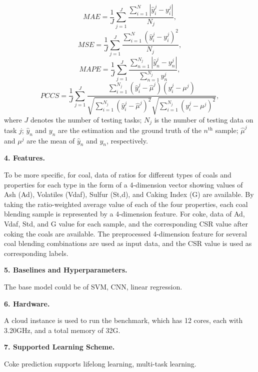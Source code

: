 \begin{equation} \label{equ:mae} 
MAE = \frac{1}{J} \sum^J_{j=1} \frac{\sum_{i=1}^N |\hat{y}^{j}_{i} - y^{j}_{i}|}{N_j}, 
\end{equation}
\begin{equation} \label{equ:mse} 
MSE = \frac{1}{J} \sum^J_{j=1} \frac{\sum_{i=1}^N (\hat{y}^{j}_{i} - y^{j}_{i})^2}{N_j},
\end{equation}
\begin{equation} \label{equ:er} 
MAPE = \frac{1}{J} \sum^J_{j=1} \frac{\sum_{n=1}^{N_j} |\hat{y}^j_n - y^j_n|}{\sum_{n=1}^{N_j} y^j_n}, 
\end{equation}
\begin{equation} \label{equ:pccs} 
PCCS = \frac{1}{J} \sum^J_{j=1} \frac{\sum_{i=1}^{N_j} (\hat{y}^{j}_{i} - \hat{\mu}^j)(y^{j}_{i} - \mu^j)}{\sqrt{\sum_{i=1}^{N_j} (\hat{y}^{j}_{i} - \hat{\mu}^j)^2}\sqrt{\sum_{i=1}^{N_j}(y^{j}_{i} - \mu^j)^2}},
\end{equation}
where $J$ denotes the number of testing tasks; $N_j$ is the number of testing data on task $j$; $\hat{y}_n$ and $y_n$ are the estimation and the ground truth of the $n^\text{th}$ sample; $\hat{\mu}^j$ and $\mu^j$ are the mean of $\hat{y}_n$ and $y_n$, respectively.

\textbf{4. Features.}

To be more specific, for coal, data of ratios for different types of coals and properties for each type in the form of a 4-dimension vector showing values of Ash (Ad), Volatiles (Vdaf), Sulfur (St,d), and Caking Index (G) are available. By taking the ratio-weighted average value of each of the four properties, each coal blending sample is represented by a 4-dimension feature. For coke, data of Ad, Vdaf, Std, and G value for each sample, and the corresponding CSR value after coking the coals are available. The preprocessed 4-dimension feature for several coal blending combinations are used as input data, and the CSR value is used as corresponding labels. 

\textbf{5. Baselines and Hyperparameters.}

The base model could be of SVM, CNN, linear regression. 

\textbf{6. Hardware.}

A cloud instance is used to run the benchmark, which has 12 cores, each with 3.20GHz, and a total memory of 32G.

\textbf{7. Supported Learning Scheme.}

Coke prediction supports lifelong learning, multi-task learning. 





